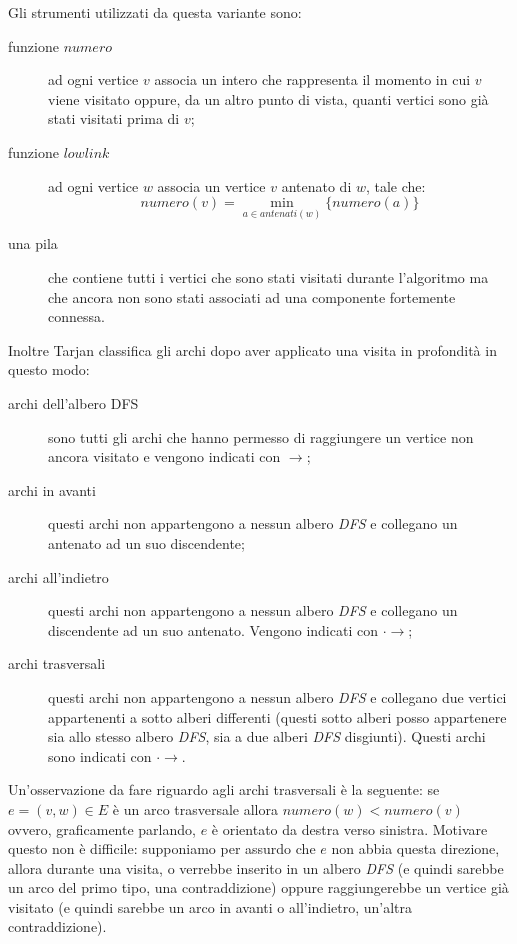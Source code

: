 Gli strumenti utilizzati da questa variante sono:
\begin{description}
\item[funzione $numero$] ad ogni vertice $v$ associa un intero che
  rappresenta il momento in cui $v$ viene visitato oppure, da un altro
  punto di vista, quanti vertici sono gi\`a stati visitati prima di
  $v$;
\item[funzione $lowlink$] ad ogni vertice $w$ associa un vertice $v$
  antenato di $w$, tale che:
  \begin{displaymath}
    numero(v) = \min_{a \in antenati(w)}\{numero(a)\}
\end{displaymath}
\item[una pila] che contiene tutti i vertici che sono stati visitati
  durante l'algoritmo ma che ancora non sono stati associati ad una
  componente fortemente connessa.
\end{description}

Inoltre Tarjan classifica gli archi dopo aver applicato una visita in
profondit\`a in questo modo:
\begin{description}
\item[archi dell'albero DFS] sono tutti gli archi che hanno permesso
  di raggiungere un vertice non ancora visitato e vengono indicati con
  $\rightarrow$;
\item[archi in avanti] questi archi non appartengono a nessun albero
  \emph{DFS} e collegano un antenato ad un suo discendente;
\item[archi all'indietro] questi archi non appartengono a nessun
  albero \emph{DFS} e collegano un discendente ad un suo antenato.
  Vengono indicati con $\cdot\rightarrow$;
\item[archi trasversali] questi archi non appartengono a nessun albero
  \emph{DFS} e collegano due vertici appartenenti a sotto alberi
  differenti (questi sotto alberi posso appartenere sia allo stesso
  albero \emph{DFS}, sia a due alberi \emph{DFS} disgiunti). Questi
  archi sono indicati con $\cdot\rightarrow$.
\end{description}
Un'osservazione da fare riguardo agli archi trasversali \`e la
seguente: se $e = (v, w) \in E$ \`e un arco trasversale allora
$numero(w) < numero(v)$ ovvero, graficamente parlando, $e$ \`e
orientato da destra verso sinistra. Motivare questo non \`e difficile:
supponiamo per assurdo che $e$ non abbia questa direzione, allora
durante una visita, o verrebbe inserito in un albero \emph{DFS} (e
quindi sarebbe un arco del primo tipo, una contraddizione) oppure
raggiungerebbe un vertice gi\`a visitato (e quindi sarebbe un arco in
avanti o all'indietro, un'altra contraddizione).

